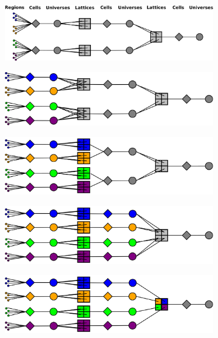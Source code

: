 \newpage
\begin{figure}[h!]
\begin{subfigure}{\textwidth}
  \centering
  \includegraphics[width=0.82\linewidth]{figures/workflow/opencg/region-differentiation-1}
  \caption{}
  \label{fig:differentation-1}
\end{subfigure}
\begin{subfigure}{\textwidth}
  \centering
  \includegraphics[width=0.75\linewidth]{figures/workflow/opencg/region-differentiation-2}
  \caption{}
  \label{fig:differentation-2}
\end{subfigure}
\begin{subfigure}{\textwidth}
  \centering
  \includegraphics[width=0.75\linewidth]{figures/workflow/opencg/region-differentiation-3}
  \caption{}
  \label{fig:differentation-3}
\end{subfigure}
\begin{subfigure}{\textwidth}
  \centering
  \includegraphics[width=0.75\linewidth]{figures/workflow/opencg/region-differentiation-4}
  \caption{}
  \label{fig:differentation-4}
\end{subfigure}
\begin{subfigure}{\textwidth}
  \centering
  \includegraphics[width=0.75\linewidth]{figures/workflow/opencg/region-differentiation-5}

\end{subfigure}
\end{figure}
